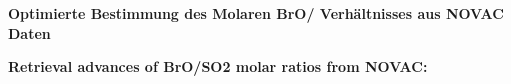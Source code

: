 \thispagestyle{empty}
\begin{center}
  \begin{minipage}[c][0.48\textheight][b]{0.9\textwidth}
    \small
    \textbf{
      Optimierte Bestimmung des Molaren BrO/ Verhältnisses aus NOVAC Daten
    }\par
    \vspace{\baselineskip}
    
  \end{minipage}\par
  \vfill
  \begin{minipage}[c][0.48\textheight][b]{0.9\textwidth}
    \small
    \textbf{
      Retrieval advances of BrO/SO2 molar ratios from NOVAC:
    }\par
    \vspace{\baselineskip}
    
  \end{minipage}
\end{center}
